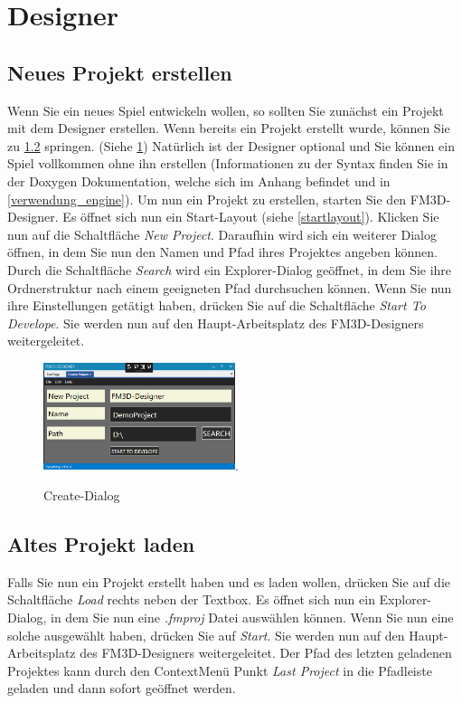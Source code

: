 \section{Designer}
\label{verwendung_designer}

\subsection{Neues Projekt erstellen}
\label{neuesprojekt}
Wenn Sie ein neues Spiel entwickeln wollen, so sollten Sie zunächst ein Projekt mit dem Designer erstellen. Wenn bereits ein Projekt erstellt wurde, können Sie zu \cref{projektladen} springen. (Siehe \cref{createprojekt})
Natürlich ist der Designer optional und Sie können ein Spiel vollkommen ohne ihn erstellen (Informationen zu der Syntax finden Sie in der Doxygen Dokumentation, welche sich im Anhang befindet und in \cref{verwendung_engine}).
Um nun ein Projekt zu erstellen, starten Sie den FM3D-Designer. Es öffnet sich nun ein Start-Layout (siehe \cref{startlayout}). Klicken Sie nun auf die Schaltfläche \textit{New Project}. 
Daraufhin wird sich ein weiterer Dialog öffnen, in dem Sie nun den Namen und Pfad ihres Projektes angeben können. Durch die Schaltfläche \textit{Search} wird ein Explorer-Dialog geöffnet, in dem Sie ihre Ordnerstruktur nach einem geeigneten Pfad durchsuchen können. Wenn Sie nun ihre Einstellungen getätigt haben, drücken Sie auf die Schaltfläche \textit{Start To Develope}. Sie werden nun auf den Haupt-Arbeitsplatz des FM3D-Designers weitergeleitet.
\begin{figure}
	\begin{center}
		\includegraphics[width=0.5\textwidth]{04verwendung/Designer/00createproject.PNG}.
		\caption{Create-Dialog}\label{createprojekt}
	\end{center}
\end{figure}

\subsection{Altes Projekt laden}
\label{projektladen}
Falls Sie nun ein Projekt erstellt haben und es laden wollen, drücken Sie auf die Schaltfläche \textit{Load} rechts neben der Textbox. Es öffnet sich nun ein Explorer-Dialog, in dem Sie nun eine \textit{.fmproj} Datei auswählen können. Wenn Sie nun eine solche ausgewählt haben, drücken Sie auf \textit{Start}. Sie werden nun auf den Haupt-Arbeitsplatz des FM3D-Designers weitergeleitet.
Der Pfad des letzten geladenen Projektes kann durch den ContextMenü Punkt \textit{Last Project} in die Pfadleiste geladen und dann sofort geöffnet werden.

